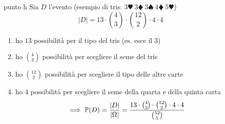 \begin{enumerate}
\begin{enumerate}
	\end{enumerate}
	\item [punto h] Sia $D$ l'evento  (esempio di tris: $3\varheartsuit \ 3\vardiamondsuit \ 3\spadesuit \ 4\vardiamondsuit \ 5\varheartsuit $)
	\begin{equation*}
		| D| =13\cdot \binom{4}{3} \cdot \binom{12}{2} \cdot 4\cdot 4
	\end{equation*}
	\begin{enumerate}
		\item ho $13$ possibilità per il tipo del tris (es. esce il $3$)
		\item ho $\binom{4}{3}$ possibilità per scegliere il seme del tris
		\item ho $\binom{12}{2}$ possibilità per scegliere il tipo delle altre carte
		\item ho $4$ possibilità per scegliere il seme della quarta e della quinta carta
		\begin{equation*}
			\implies \mathbb{P}(D) =\frac{| D| }{|\Omega| } =\frac{13\cdot \binom{4}{3} \cdot \binom{12}{2} \cdot 4\cdot 4}{\binom{52}{5}}
		\end{equation*}
	\end{enumerate}
\end{enumerate}